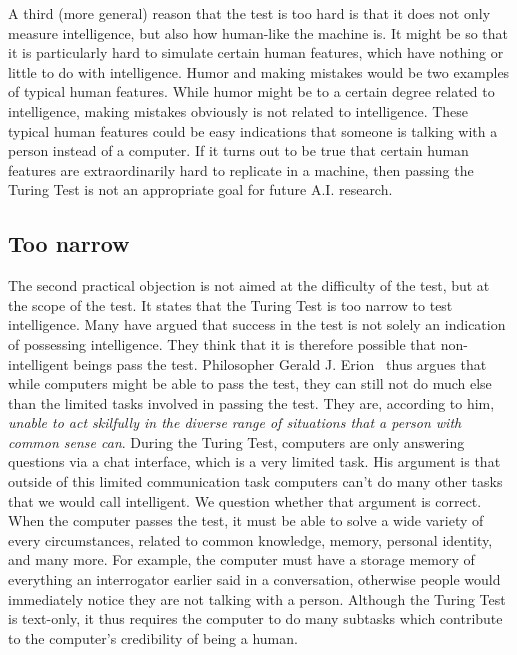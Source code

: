 A third (more general) reason that the test is too hard is that it does not only measure intelligence, but also how human-like the machine is. It might be so that it is particularly hard to simulate certain human features, which have nothing or little to do with intelligence. Humor and making mistakes would be two examples of typical human features. While humor might be to a certain degree related to intelligence, making mistakes obviously is not related to intelligence. These typical human features could be easy indications that someone is talking with a person instead of a computer. If it turns out to be true that certain human features are extraordinarily hard to replicate in a machine, then passing the Turing Test is not an appropriate goal for future A.I. research.


\subsection{Too narrow}
The second practical objection is not aimed at the difficulty of the test, but at the scope of the test. It states that the Turing Test is too narrow to test intelligence. Many have argued that success in the test is not solely an indication of possessing intelligence. They think that it is therefore possible that non-intelligent beings pass the test. Philosopher Gerald J. Erion~\cite{copeland2015artificial} thus argues that while computers might be able to pass the test, they can still not do much else than the limited tasks involved in passing the test. They are, according to him, \textit{unable to act skilfully in the diverse range of situations that a person with common sense can}. During the Turing Test, computers are only answering questions via a chat interface, which is a very limited task. His argument is that outside of this limited communication task computers can't do many other tasks that we would call intelligent. We question whether that argument is correct. When the computer passes the test, it must be able to solve a wide variety of every circumstances, related to common knowledge, memory, personal identity, and many more. For example, the computer must have a storage memory of everything an interrogator earlier said in a conversation, otherwise people would immediately notice they are not talking with a person. Although the Turing Test is text-only, it thus requires the computer to do many subtasks which contribute to the computer's credibility of being a human.
